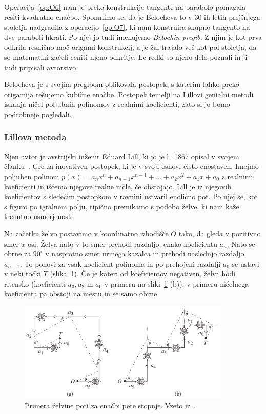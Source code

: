 Operacija~\ref{op:O6} nam je preko konstrukcije tangente na parabolo pomagala rešiti kvadratno enačbo. Spomnimo se, da je Belocheva to v 30-ih letih prejšnjega stoletja nadgradila z operacijo~\ref{op:O7}, ki nam konstruira skupno tangento na dve paraboli hkrati. Po njej jo tudi imenujemo \emph{Belochin pregib}. Z njim je kot prva odkrila resnično moč origami konstrukcij, a je žal trajalo več kot pol stoletja, da so matematiki začeli ceniti njeno odkritje. Le redki so njeno delo poznali in ji tudi pripisali avtorstvo.

Belocheva je s svojim pregibom oblikovala postopek, s katerim lahko preko origamija rešujemo kubične enačbe. Postopek temelji na Lillovi genialni metodi iskanja ničel poljubnih polinomov z realnimi koeficienti, zato si jo bomo podrobneje pogledali.

\subsubsection{Lillova metoda}

Njen avtor je avstrijski inženir Eduard Lill, ki jo je l.\ 1867 opisal v svojem članku~\cite{lill1867}. Gre za inovativen postopek, ki je v svoji osnovi čisto enostaven. Imejmo poljuben polinom $ p(x) = a_n x^n + a_{n-1} x^{n-1} + \ldots + a_2 x^2 + a_1 x + a_0 $ z realnimi koeficienti in iščemo njegove realne ničle, če obstajajo. Lill je iz njegovih koeficientov s sledečim postopkom v ravnini ustvaril enolično pot. Po njej se, kot s figuro po igralnem polju, tipično premikamo s podobo želve, ki nam kaže trenutno usmerjenost:

Na začetku želvo postavimo v koordinatno izhodišče $O$ tako, da gleda v pozitivno smer $x$-osi. Želva nato v to smer prehodi razdaljo, enako koeficientu $a_n$. Nato se obrne za $90^\circ$ v nasprotno smer urinega kazalca in prehodi naslednjo razdaljo $a_{n-1}$. To ponovi za vsak koeficient polinoma in po prehojeni razdalji $a_0$ se ustavi v neki točki $T$ (slika~\ref{fig:primera_zelve}). Če je kateri od koeficientov negativen, želva hodi ritensko (koeficienti $a_3, a_2$ in $a_0$ v primeru na sliki~\ref{fig:primera_zelve} (b)), v primeru ničelnega koeficienta pa obstoji na mestu in se samo obrne.

\begin{figure}[h]
    \centering
    \includegraphics[width=0.9\textwidth]{images/kubična enačba/primera_zelvine_poti.png}
    \caption[Primera želvine poti]{Primera želvine poti za enačbi pete stopnje. Vzeto iz~\cite[str.\ 311]{hull2011}.}
    \label{fig:primera_zelve}
\end{figure}

